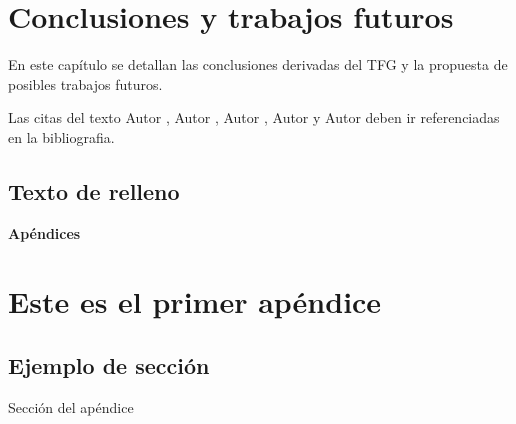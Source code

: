\documentclass[12pt,twoside,titlepage]{report}
\newcommand\blankpage{%
    \newpage
    \null
    \thispagestyle{empty}%
    \newpage}
\begin{document}
\chapter{Conclusiones y trabajos futuros}

En este capítulo se detallan las conclusiones derivadas del TFG y la propuesta de posibles trabajos futuros.

Las citas del texto Autor \cite{giaquinta}, Autor \cite{fortune}, Autor \cite{fortuneB}, Autor \cite{mitchell} y Autor \cite{morrey} deben ir referenciadas en la bibliografia.


\section{Texto de relleno}

\lipsum[1-18]
\blankpage










{}

\footnotesize{
%


}



\raggedbottom
\afterpage{\blankpage}

\newpage





\appendix

{}

\mbox{}
\vfill
\begin{center}
\begin{Huge}
\textbf{Apéndices}
\end{Huge}
\end{center}
\vfill
\mbox{}
\thispagestyle{empty}

\newpage
\mbox{}
\thispagestyle{empty}
\newpage


\chapter{Este es el primer apéndice}
\label{sec:apendice}


\section{Ejemplo de sección}

Sección del apéndice




\end{document}
